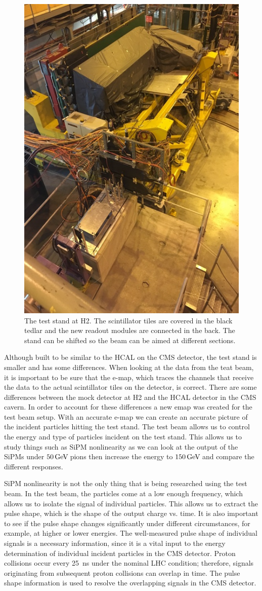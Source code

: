 \begin{figure}
\centering
\includegraphics[width=0.6\linewidth]{Figures/Teststand.png}
\caption{The test stand at H2. The scintillator tiles are covered in the black tedlar and the new readout modules are connected in the back. The stand can be shifted so the beam can be aimed at different sections.}
\label{fig:stand}
\end{figure}

Although built to be similar to the HCAL on the CMS detector, the test stand is smaller and has some differences. When looking at the data from the teat beam, it is important to be sure that the e-map, which traces the channels that receive the data to the actual scintillator tiles on the detector, is correct. There are some differences between the mock detector at H2 and the HCAL detector in the CMS cavern. In order to account for these differences a new emap was created for the test beam setup. With an accurate e-map we can create an accurate picture of the incident particles hitting the test stand. The test beam allows us to control the energy and type of particles incident on the test stand. This allows us to study things such as SiPM nonlinearity as we can look at the output of the SiPMs under $50 {\,\text{Ge\hspace{-.08em}V\hspace{-0.16em}}}$ pions then increase the energy to $150 {\,\text{Ge\hspace{-.08em}V\hspace{-0.16em}}}$ and compare the different responses. 

SiPM nonlinearity is not the only thing that is being researched using the test beam. In the test beam, the particles come at a low enough frequency, which allows us to isolate the signal of individual particles. This allows us to extract the pulse shape, which is the shape of the output charge vs. time. It is also important to see if the pulse shape changes significantly under different circumstances, for example, at higher or lower energies. The well-measured pulse shape of individual signals is a necessary information, since it is a vital input to the energy determination of individual incident particles in the CMS detector. Proton collisions occur every 25~ns under the nominal LHC condition; therefore, signals originating from subsequent proton collisions can overlap in time. The pulse shape information is used to resolve the overlapping signals in the CMS detector.

